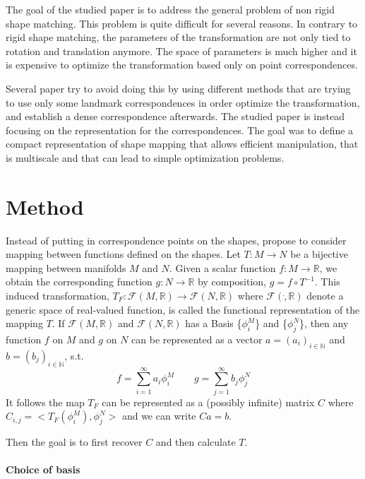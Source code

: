 \documentclass[10pt,twocolumn,letterpaper]{article}
\begin{document}
The goal of the studied paper is to address the general problem of non rigid shape matching. This problem is quite difficult for several reasons. In contrary to rigid shape matching, the parameters of the transformation are not only tied to rotation and translation anymore. The space of parameters is much higher and it is expensive to optimize the transformation based only on point correspondences. 

Several paper try to avoid doing this by using different methods that are trying to use only some landmark correspondences in order optimize the transformation, and establish a dense correspondence afterwards. The studied paper is instead focusing on the representation for the correspondences. The goal was to define a compact representation of shape mapping that allows efficient manipulation, that is multiscale and that can lead to simple optimization problems.


\section{Method} %
Instead of putting in correspondence points on the shapes, \cite{ovs} propose to consider mapping between functions defined on the shapes. 
Let $T : M \rightarrow N$ be a bijective mapping between manifolds $M$ and $N$. Given a scalar function $f: M \rightarrow \mathbb{R}$, we obtain the corresponding function $g : N \rightarrow \mathbb{R}$ by composition, $g=f \circ T^{-1}$. This induced transformation, $T_F : \mathcal{F}(M,\mathbb{R})\rightarrow \mathcal{F}(N,\mathbb{R})$ where $\mathcal{F}(\dot,\mathbb{R})$ denote a generic space of real-valued function, is called the functional representation of the mapping $T$. 
If $\mathcal{F}(M,\mathbb{R})$ and $\mathcal{F}(N,\mathbb{R})$ has a Basis \{$\phi_i^M$\} and \{$\phi_j^N$\}, then any function $f$ on $M$ and $g$ on $N$ can be represented as a vector $a=(a_i)_{i \in \mathbb{N}}$ and $b=(b_j)_{i \in \mathbb{N}}$, s.t.
\begin{equation}
	f = \sum_{i=1}^{\infty}a_i \phi_i^M  \quad \quad g = \sum_{j=1}^{\infty}b_j \phi_j^N
\end{equation}
It follows the map $T_F$ can be represented as a (possibly infinite) matrix $C$ where $C_{i,j}=<T_F(\phi_i^M),\phi_j^N>$ and we can write $Ca=b$.

Then the goal is to first recover $C$ and then calculate $T$.

\paragraph{Choice of basis}
\end{document}
